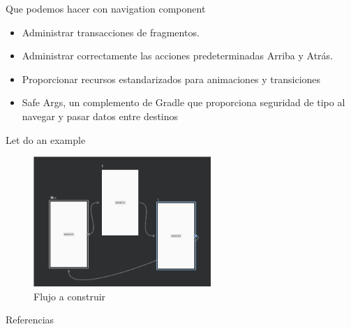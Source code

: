 \documentclass[10pt,xcolor={table,dvipsnames},t]{beamer}
\begin{document}
\begin{frame}{Que podemos hacer con navigation component}

\justifying

\begin{itemize}
  \item Administrar transacciones de fragmentos.
  \item Administrar correctamente las acciones predeterminadas Arriba y Atrás.
  \item Proporcionar recursos estandarizados para animaciones y transiciones
  \item Safe Args, un complemento de Gradle que proporciona seguridad de tipo al navegar y pasar datos entre destinos
\end{itemize}

\end{frame}

\begin{frame}{Let do an example}

\begin{figure}
\includegraphics[width=0.6\textwidth]{work_flow.png}
\caption{Flujo a construir}
\end{figure}

\end{frame}

\begin{frame}{Referencias}

\justifying

\nocite{*}
 
 
\end{frame}
\end{document}
